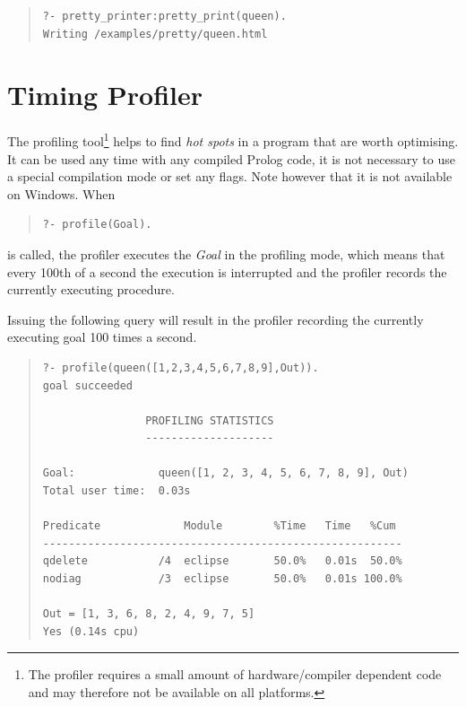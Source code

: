 \begin{quote}
\begin{verbatim}
?- pretty_printer:pretty_print(queen).
Writing /examples/pretty/queen.html
\end{verbatim}
\end{quote}


\section{Timing Profiler}

 The profiling tool\footnote{The profiler requires a 
small amount of hardware/compiler dependent code and may therefore not 
be available on all platforms.} helps to find \emph{hot spots} in
a program that are worth optimising. It can be used any time with any
compiled Prolog code, it is not necessary to use a special compilation
mode or set any flags.  Note however that it is not available on
Windows.  When
\begin{quote}\begin{verbatim}
?- profile(Goal).
\end{verbatim}\end{quote}
 is called, the profiler executes the \emph{Goal} in
the profiling mode, which means that every 100th of a second the
execution is interrupted and the profiler records the currently
executing procedure.

Issuing the following query will result in the profiler recording the
currently executing goal 100 times a second.

\begin{quote}\begin{verbatim}
?- profile(queen([1,2,3,4,5,6,7,8,9],Out)).
goal succeeded

                PROFILING STATISTICS
                --------------------

Goal:             queen([1, 2, 3, 4, 5, 6, 7, 8, 9], Out)
Total user time:  0.03s

Predicate             Module        %Time   Time   %Cum
--------------------------------------------------------
qdelete           /4  eclipse       50.0%   0.01s  50.0%
nodiag            /3  eclipse       50.0%   0.01s 100.0%

Out = [1, 3, 6, 8, 2, 4, 9, 7, 5]
Yes (0.14s cpu)
\end{verbatim}\end{quote}

